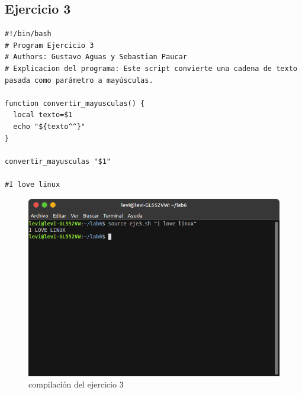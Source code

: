 \documentclass[11pt,twoside]{book}
\begin{document}
\subsection{Ejercicio 3}
\begin{lstlisting}
#!/bin/bash
# Program Ejercicio 3
# Authors: Gustavo Aguas y Sebastian Paucar
# Explicacion del programa: Este script convierte una cadena de texto pasada como parámetro a mayúsculas.

function convertir_mayusculas() {
  local texto=$1
  echo "${texto^^}"
}

convertir_mayusculas "$1"

#I love linux
\end{lstlisting}
\begin{figure}[h]
    \centering
    \includegraphics[width=0.8\linewidth]{img_tarea6/eje3con.png}
    \caption{ compilación del ejercicio 3}
\end{figure}
\newpage
\end{document}
